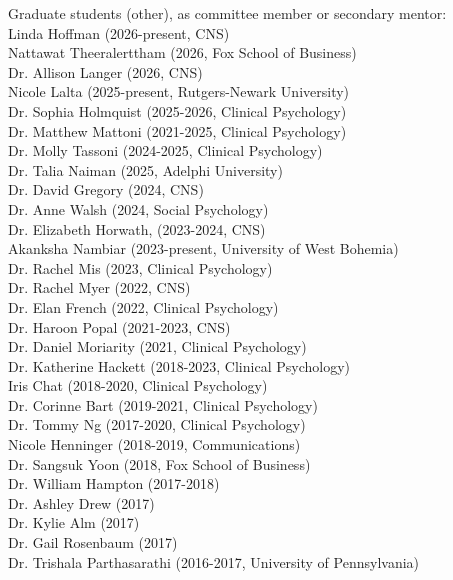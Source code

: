 \documentclass[11pt, letterpaper]{article}
\begin{document}
\begin{tabbing}
Graduate students (other), as committee member or secondary mentor: \\  [.1cm]
\> Linda Hoffman (2026-present, CNS) \\
\> Nattawat Theeralerttham (2026, Fox School of Business) \\
\> Dr. Allison Langer (2026, CNS) \\
\> Nicole Lalta (2025-present, Rutgers-Newark University) \\
\> Dr. Sophia Holmquist (2025-2026, Clinical Psychology) \\
\> Dr. Matthew Mattoni (2021-2025, Clinical Psychology) \\
\> Dr. Molly Tassoni (2024-2025, Clinical Psychology) \\
\> Dr. Talia Naiman (2025, Adelphi University) \\
\> Dr. David Gregory (2024, CNS) \\
\> Dr. Anne Walsh (2024, Social Psychology) \\
\> Dr. Elizabeth Horwath, (2023-2024, CNS) \\
\> Akanksha Nambiar (2023-present, University of West Bohemia) \\
\> Dr. Rachel Mis (2023, Clinical Psychology) \\
\> Dr. Rachel Myer (2022, CNS) \\
\> Dr. Elan French (2022, Clinical Psychology) \\
\> Dr. Haroon Popal (2021-2023, CNS) \\
\> Dr. Daniel Moriarity (2021, Clinical Psychology) \\
\> Dr. Katherine Hackett (2018-2023, Clinical Psychology) \\
\> Iris Chat (2018-2020, Clinical Psychology) \\
\> Dr. Corinne Bart (2019-2021, Clinical Psychology) \\
\> Dr. Tommy Ng (2017-2020, Clinical Psychology) \\
\> Nicole Henninger (2018-2019, Communications) \\
\> Dr. Sangsuk Yoon (2018, Fox School of Business) \\
\> Dr. William Hampton (2017-2018) \\
\> Dr. Ashley Drew (2017) \\
\> Dr. Kylie Alm (2017) \\
\> Dr. Gail Rosenbaum (2017) \\
\> Dr. Trishala Parthasarathi (2016-2017, University of Pennsylvania) \\ [.2cm]


\end{tabbing}
\end{document}
